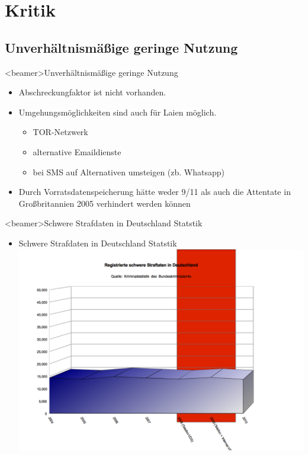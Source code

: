 \section{Kritik}
  \subsection*{Unverhältnismäßige geringe Nutzung}
    \begin{frame}<beamer>{Unverhältnismäßige geringe Nutzung}
      \begin{itemize}
        \item
          Abschreckungfaktor ist nicht vorhanden.
        \item
         Umgehungsmöglichkeiten sind auch für Laien möglich.
        \begin{itemize}
          \item TOR-Netzwerk
          \item alternative Emaildienste
          \item bei SMS auf Alternativen umsteigen (zb. Whatsapp)
        \end{itemize}
        \item Durch Vorratsdatenspeicherung hätte weder 9/11 als auch die Attentate in Großbritannien 2005 verhindert werden können
      \end{itemize}
    \end{frame}

\begin{frame}<beamer>{Schwere Strafdaten in Deutschland Statstik}
\begin{itemize}
        \item Schwere Strafdaten in Deutschland Statstik
        \includegraphics[height=1\textheight]{sections/img/schwere_verbrechen_in_DE.png}
    \end{itemize}
    \end{frame}
    
